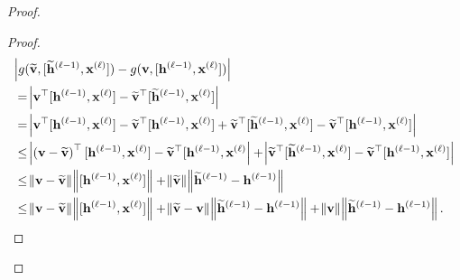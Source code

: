 \begin{proof}
	\begin{proof}
		\begingroup \allowdisplaybreaks
		\begin{align*}
			&\abs{g(\widetilde{\mathbf{v}}, [\widetilde{\mathbf{h}}^{(\ell-1)},  \mathbf{x}^{(\ell)}]) - g(\mathbf{v}, [\mathbf{h}^{(\ell-1)},  \mathbf{x}^{(\ell)}])}\\ &= \abs{\mathbf{v}^{\top} [\mathbf{h}^{(\ell-1)},  \mathbf{x}^{(\ell)}] - \widetilde{\mathbf{v}}^{\top} [\widetilde{\mathbf{h}}^{(\ell-1)},  \mathbf{x}^{(\ell)}]} \\&
			= \abs{\mathbf{v}^{\top} [\mathbf{h}^{(\ell-1)},  \mathbf{x}^{(\ell)}] - \widetilde{\mathbf{v}}^{\top} [\mathbf{h}^{(\ell-1)},  \mathbf{x}^{(\ell)}] + \widetilde{\mathbf{v}}^{\top} [\widetilde{\mathbf{h}}^{(\ell-1)},  \mathbf{x}^{(\ell)}] - \widetilde{\mathbf{v}}^{\top} [\mathbf{h}^{(\ell-1)},  \mathbf{x}^{(\ell)}]} \\&
			\le\abs{\left(\mathbf{v} - \widetilde{\mathbf{v}}\right)^{\top} [\mathbf{h}^{(\ell-1)},  \mathbf{x}^{(\ell)}] - \widetilde{\mathbf{v}}^{\top} [\mathbf{h}^{(\ell-1)},  \mathbf{x}^{(\ell)}} + \abs{\widetilde{\mathbf{v}}^{\top} [\widetilde{\mathbf{h}}^{(\ell-1)},  \mathbf{x}^{(\ell)}] - \widetilde{\mathbf{v}}^{\top} [\mathbf{h}^{(\ell-1)},  \mathbf{x}^{(\ell)}]} 
			\\&\le \norm{\mathbf{v} - \widetilde{\mathbf{v}}} \norm{[\mathbf{h}^{(\ell-1)},  \mathbf{x}^{(\ell)}]} + \norm{\widetilde{\mathbf{v}}} \norm{\widetilde{\mathbf{h}}^{(\ell-1)} - \mathbf{h}^{(\ell-1)}}
			\\&
			\le \norm{\mathbf{v} - \widetilde{\mathbf{v}}} \norm{[\mathbf{h}^{(\ell-1)},  \mathbf{x}^{(\ell)}]} + \norm{\widetilde{\mathbf{v}} - \mathbf{v}} \norm{\widetilde{\mathbf{h}}^{(\ell-1)} - \mathbf{h}^{(\ell-1)}} + \norm{\mathbf{v}}\norm{\widetilde{\mathbf{h}}^{(\ell-1)} - \mathbf{h}^{(\ell-1)}}.
		\end{align*}
		\endgroup
		

\end{proof}
\end{proof}
